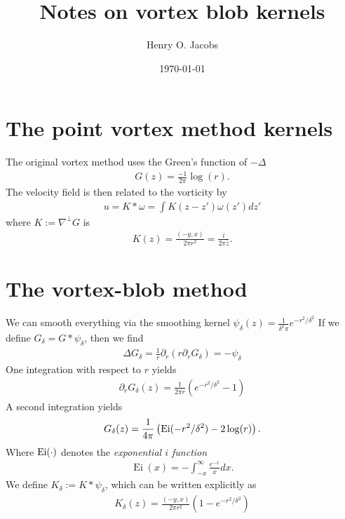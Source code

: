 \documentclass[12pt]{amsart}
\title{Notes on vortex blob kernels}
\author{Henry O. Jacobs}
\date{\today}
\DeclareMathOperator{\Ei}{Ei}
\begin{document}
\maketitle

\section{The point vortex method kernels}
The original vortex method uses the Green's function of
$-\Delta$
\begin{align*}
  G(z) = \frac{-1}{2\pi} \log(r).
\end{align*}
The velocity field is then related to the vorticity by
\begin{align*}
  u = K * \omega = \int K(z-z') \omega(z') dz'
\end{align*}
where $K := \nabla^\perp G$ is
\begin{align*}
  K(z) = \frac{(-y,x)}{2\pi r^2} = \frac{i}{2\pi \bar{z}}.
\end{align*}

\section{The vortex-blob method}
We can smooth everything via the smoothing kernel $\psi_\delta(z) = \frac{1}{\delta^2 \pi}e^{ -r^2 / \delta^2}$
If we define $G_\delta = G * \psi_\delta$, then we find
\begin{align*}
  \Delta G_\delta = \frac{1}{r} \partial_r ( r \partial_r G_\delta) = -\psi_\delta
\end{align*}
One integration with respect to $r$ yields
\begin{align*}
  \partial_r G_\delta(z) = \frac{1}{2\pi r} ( e^{-r^2/\delta^2} - 1)
\end{align*}
A second integration yields
\begin{align*}
  G_\delta(z) = \frac{1}{4\pi} \left( {\rm Ei}( -r^2 / \delta^2) - 2 \log(r) \right).
\end{align*}
Where ${\rm Ei}( \cdot )$ denotes the \emph{exponential $i$ function}
\begin{align*}
  \Ei(x) = - \int_{-x}^{\infty} \frac{e^{-x}}{x} dx.
\end{align*}
We define $K_\delta := K * \psi_\delta$, which can be written explicitly as
\begin{align*}
  K_\delta(z) = \frac{(-y,x)}{2\pi r^2} (1-e^{-r^2/\delta^2})
\end{align*}
\end{document}
